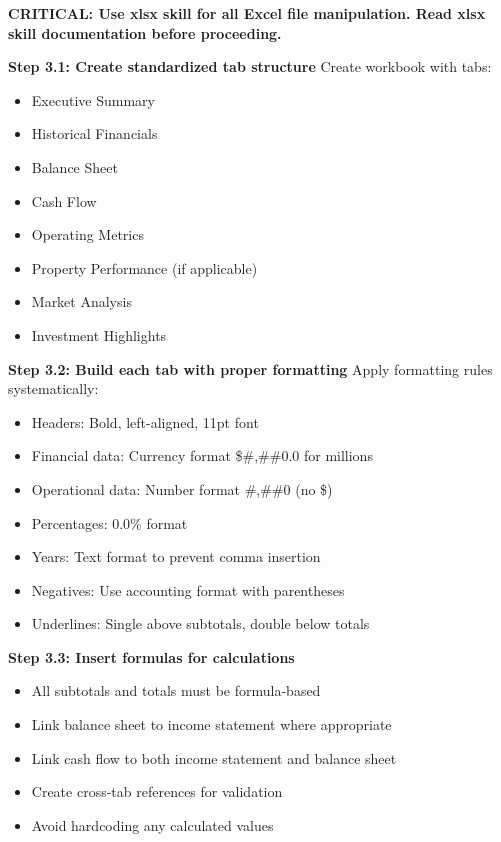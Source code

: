 \documentclass[11pt]{article}
\begin{document}
\textbf{CRITICAL: Use xlsx skill for all Excel file manipulation. Read xlsx skill documentation before proceeding.}


\textbf{Step 3.1: Create standardized tab structure} Create workbook with tabs:

\begin{itemize}[leftmargin=*,itemsep=2pt,topsep=2pt]
\item {} Executive Summary
\item {} Historical Financials
\item {} Balance Sheet
\item {} Cash Flow
\item {} Operating Metrics
\item {} Property Performance (if applicable)
\item {} Market Analysis
\item {} Investment Highlights
\end{itemize}

\textbf{Step 3.2: Build each tab with proper formatting} Apply formatting rules systematically:

\begin{itemize}[leftmargin=*,itemsep=2pt,topsep=2pt]
\item {} Headers: Bold, left-aligned, 11pt font
\item {} Financial data: Currency format \$\#,\#\#0.0 for millions
\item {} Operational data: Number format \#,\#\#0 (no \$)
\item {} Percentages: 0.0\% format
\item {} Years: Text format to prevent comma insertion
\item {} Negatives: Use accounting format with parentheses
\item {} Underlines: Single above subtotals, double below totals
\end{itemize}

\textbf{Step 3.3: Insert formulas for calculations}

\begin{itemize}[leftmargin=*,itemsep=2pt,topsep=2pt]
\item {} All subtotals and totals must be formula-based
\item {} Link balance sheet to income statement where appropriate
\item {} Link cash flow to both income statement and balance sheet
\item {} Create cross-tab references for validation
\item {} Avoid hardcoding any calculated values
\end{itemize}
\end{document}
